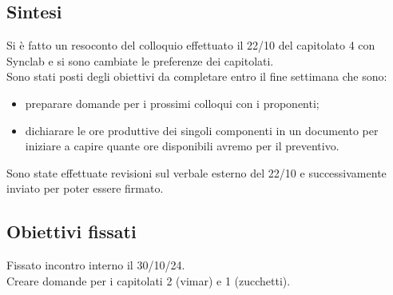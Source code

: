 \documentclass[12pt]{article}
\begin{document}
\subsection{Sintesi}
Si è fatto un resoconto del colloquio effettuato il 22/10 del capitolato 4 con Synclab e si sono cambiate le preferenze dei capitolati.\\
Sono stati posti degli obiettivi da completare entro il fine settimana che sono:
\begin{itemize}
\item preparare domande per i prossimi colloqui con i proponenti;
\item dichiarare le ore produttive dei singoli componenti in un documento per iniziare a capire quante ore disponibili avremo per il preventivo.
\end{itemize} 
Sono state effettuate revisioni sul verbale esterno del 22/10 e successivamente inviato per poter essere firmato.\\
\subsection{Obiettivi fissati}
Fissato incontro interno il 30/10/24.\\
Creare domande per i capitolati 2 (vimar) e 1 (zucchetti).
\end{document}

